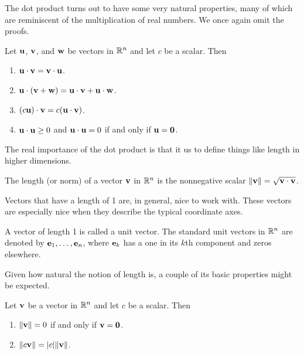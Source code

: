 \documentclass[../m073main.tex]{subfiles}
\begin{document}
The dot product turns out to have some very natural properties, many of which are reminiscent of the multiplication of real numbers.
We once again omit the proofs.

\begin{theorem}
	Let $\mathbf{u}$, $\mathbf{v}$, and $\mathbf{w}$ be vectors in $\mathbb{R}^n$ and let $c$ be a scalar.
	Then
	\begin{multicols}{2}
		\begin{enumerate}[label=(\alph*)]
			\item $\mathbf{u} \cdot \mathbf{v} = \mathbf{v} \cdot \mathbf{u}$.
			\item $\mathbf{u} \cdot (\mathbf{v} + \mathbf{w}) = \mathbf{u} \cdot \mathbf{v} + \mathbf{u} \cdot \mathbf{w}$.
			\item $(c \mathbf{u}) \cdot \mathbf{v} = c(\mathbf{u} \cdot \mathbf{v})$.
			\item $\mathbf{u} \cdot \mathbf{u} \geq 0$ and $\mathbf{u} \cdot \mathbf{u} = 0$ if and only if $\mathbf{u} = \mathbf{0}$.
		\end{enumerate}
	\end{multicols}
\end{theorem}

The real importance of the dot product is that it us to define things like length in higher dimensions.

\begin{definition}[Length]
	The length (or norm) of a vector $\mathbf{v}$ in $\mathbb{R}^n$ is the nonnegative scalar $\|\mathbf{v}\| = \sqrt{\mathbf{v} \cdot \mathbf{v}}$.
\end{definition}

Vectors that have a length of 1 are, in general, nice to work with.
These vectors are especially nice when they describe the typical coordinate axes.

\begin{definition}
	A vector of length 1 is called a unit vector.
	The standard unit vectors in $\mathbb{R}^n$ are denoted by $\mathbf{e}_1, \ldots, \mathbf{e}_n$,
	where $\mathbf{e}_k$ has a one in its $k$th component and zeros elsewhere.
\end{definition}

Given how natural the notion of length is, a couple of its basic properties might be expected.

\begin{theorem}
	Let $\mathbf{v}$ be a vector in $\mathbb{R}^n$ and let $c$ be a scalar.
	Then
	\begin{multicols}{2}
		\begin{enumerate}[label=(\alph*)]
			\item $\|\mathbf{v}\| = 0$ if and only if $\mathbf{v} = \mathbf{0}$.
			\item $\|c \mathbf{v}\| = |c| \|\mathbf{v}\|$.
		\end{enumerate}
	\end{multicols}
\end{theorem}
\end{document}
